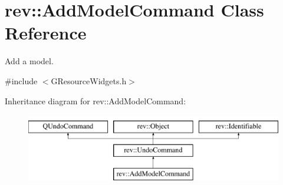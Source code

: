 \hypertarget{classrev_1_1_add_model_command}{}\section{rev\+::Add\+Model\+Command Class Reference}
\label{classrev_1_1_add_model_command}


Add a model.  




{\ttfamily \#include $<$G\+Resource\+Widgets.\+h$>$}

Inheritance diagram for rev\+::Add\+Model\+Command\+:\begin{figure}[H]
\begin{center}
\leavevmode
\includegraphics[height=3.000000cm]{classrev_1_1_add_model_command}
\end{center}
\end{figure}
